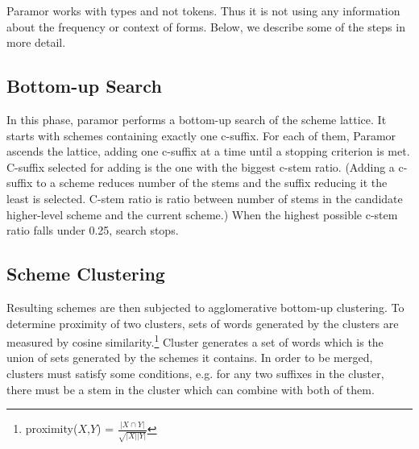 \documentclass{itatnew}
\begin{document}
\noindent
Paramor works with types and not tokens. Thus it is not using any information about the frequency or context of forms.
%
Below, we describe some of the steps in more detail.




%

\subsection{Bottom-up Search}

\noindent
In this phase, paramor performs a bottom-up search of the scheme lattice. It starts with schemes containing exactly one c-suffix. For each of them, Paramor ascends the lattice, adding one c-suffix at a time until a stopping criterion is met. C-suffix selected for adding is the one with the biggest c-stem ratio. (Adding a c-suffix to a scheme reduces number of the stems and the suffix reducing it the least is selected. C-stem ratio is ratio between number of stems in the candidate higher-level scheme and the current scheme.) When the highest possible c-stem ratio falls under 0.25, search stops.

\subsection{Scheme Clustering}

\noindent
Resulting schemes are then subjected to agglomerative bottom-up clustering. To determine proximity of two clusters, sets of words generated by the clusters are measured by cosine similarity.\footnote{proximity($X$,$Y$) = $\frac{|X \cap Y|}{\sqrt{|X||Y|}}$} Cluster generates a set of words which is the union of sets generated by the schemes it contains. In order to be merged, clusters must satisfy some conditions, e.g. for any two suffixes in the cluster, there must be a stem in the cluster which can combine with both of them.
\end{document}
